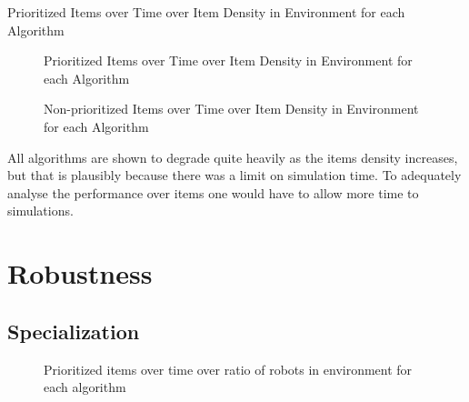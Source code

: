 \begin{table} [h]
     \caption{Prioritized Items over Time over Item Density in Environment for each Algorithm}
     \label{ratio}
	\centering
	\footnotesize
	
\end{table}

\begin{figure}[!htb]
\centering
\resizebox{\textwidth}{!}{}
\caption{Prioritized Items over Time over Item Density in Environment  for each Algorithm}
\label{objectgoldplot}
\end{figure}


\begin{figure}[!htb]
\centering
\resizebox{\textwidth}{!}{}
\caption{Non-prioritized Items over Time over Item Density in Environment for each Algorithm}
\label{objectgoldplot}
\end{figure}

All algorithms are shown to degrade quite heavily as the items density increases, but that is plausibly because there was a limit on simulation time. To adequately analyse the performance over items one would have to allow more time to simulations. 

\section{Robustness}
\label{results:robustness}



\subsection{Specialization}
\label{results:specialization}


\begin{figure}[!htb]
\centering
\resizebox{\textwidth}{!}{}
\caption{Prioritized items over time over ratio of robots in environment for each algorithm }
\label{divisiongoldplot}
\end{figure}


